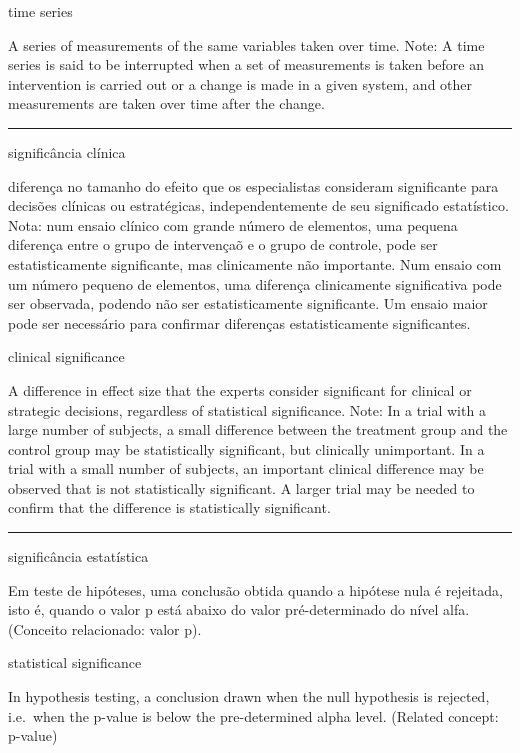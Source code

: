 \documentclass[
]{book}
\begin{document}
time series

A series of measurements of the same variables taken over time. Note: A time series is said to be interrupted when a set of measurements is taken before an intervention is carried out or a change is made in a given system, and other measurements are taken over time after the change.

\begin{center}\rule{0.5\linewidth}{0.5pt}\end{center}

significância clínica

diferença no tamanho do efeito que os especialistas consideram significante para decisões clínicas ou estratégicas, independentemente de seu significado estatístico. Nota: num ensaio clínico com grande número de elementos, uma pequena diferença entre o grupo de intervençaõ e o grupo de controle, pode ser estatisticamente significante, mas clinicamente não importante. Num ensaio com um número pequeno de elementos, uma diferença clinicamente significativa pode ser observada, podendo não ser estatisticamente significante. Um ensaio maior pode ser necessário para confirmar diferenças estatisticamente significantes.

clinical significance

A difference in effect size that the experts consider significant for clinical or strategic decisions, regardless of statistical significance. Note: In a trial with a large number of subjects, a small difference between the treatment group and the control group may be statistically significant, but clinically unimportant. In a trial with a small number of subjects, an important clinical difference may be observed that is not statistically significant. A larger trial may be needed to confirm that the difference is statistically significant.

\begin{center}\rule{0.5\linewidth}{0.5pt}\end{center}

significância estatística

Em teste de hipóteses, uma conclusão obtida quando a hipótese nula é rejeitada, isto é, quando o valor p está abaixo do valor pré-determinado do nível alfa. (Conceito relacionado: valor p).

statistical significance

In hypothesis testing, a conclusion drawn when the null hypothesis is rejected, i.e.~when the p-value is below the pre-determined alpha level. (Related concept: p-value)
\end{document}

